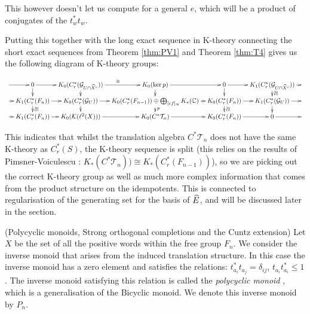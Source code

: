 \begin{example}
This however doesn't let us compute for a general $e$, which will be a product of conjugates of the $t_{w}^{*}t_{w}$.

Putting this together with the long exact sequence in K-theory connecting the short exact sequences from Theorem \ref{thm:PV1} and Theorem \ref{thm:T4} gives us the following diagram of K-theory groups:

$$
\xymatrix@=0.7em{\ar[r] & 0 \ar[r]\ar[d] & K_{0}(C^{*}_{r}(\G_{U\cap \widehat{X}^{c}}))\ar[d] \ar[r]^{\cong}& K_{0}(\ker p) \ar[r]\ar[d]& 0 \ar[r]\ar[d] & K_{1}(C^{*}_{r}(\G_{U\cap \widehat{X}^{c}})) \ar[r]\ar[d]^{\ucong} &\\
\ar[r] & K_{1}(C^{*}_{r}(F_{n})) \ar[r]\ar[d]^{\ucong} & K_{0}(C^{*}_{r}(\G_{U}))\ar[r]\ar[d]& K_{0}(C^{*}_{r}(F_{n-1})) \oplus \bigoplus_{[ef]_{\approx}} K_{*}(\mathbb{C})\ar[r]\ar[d]^{p}& K_{0}(C^{*}_{r}(F_{n}))\ar[r]\ar[d]^{\ucong} & K_{1}(C^{*}_{r}(\G_{U}))\ar[d] \ar[r] & \\
\ar[r] & K_{1}(C^{*}_{r}(F_{n})) \ar[r]& K_{0}(\mathcal{K}(\ell^{2}(X))) \ar[r]& K_{0}(C^{*}\mathcal{T}_{n}) \ar[r]& K_{0}(C^{*}_{r}(F_{n})) \ar[r]& 0 \ar[r] & 
}
$$

This indicates that whilst the translation algebra $C^{*}\mathcal{T}_{n}$ does not have the same K-theory as $C^{*}_{r}(S)$, the K-theory sequence is split (this relies on the results of Pimsner-Voiculescu \cite{MR670181}: $K_{*}(C^{*}\mathcal{T}_{n}))\cong K_{*}(C^{*}_{r}(F_{n-1}))$), so we are picking out the correct K-theory group as well as much more complex information that comes from the product structure on the idempotents. This is connected to regularisation of the generating set for the basis of $\widehat{E}$, and will be discussed later in the section.

\begin{example}(Polycyclic monoids, Strong orthogonal completions and the Cuntz extension)
Let $X$ be the set of all the positive words within the free group $F_{n}$. We consider the inverse monoid that arises from the induced translation structure. In this case the inverse monoid has a zero element and satisfies the relations: $t_{a_{i}}^{*}t_{a_{j}}=\delta_{ij}$, $t_{a_{i}}t_{a_{i}}^{*} \leq 1$. The inverse monoid satisfying this relation is called the \textit{polycyclic monoid} \cite{MR2372319}, which is a generalisation of the Bicyclic monoid. We denote this inverse monoid by $P_{n}$.



\end{example}
\end{example}

